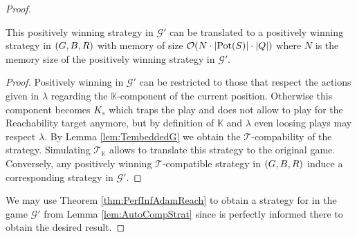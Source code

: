 \begin{proof}
\begin{lemma}
    This positively winning strategy in 
    $\mathcal{G'}$ can be translated to a positively winning strategy in 
    $\left(G, B, R\right)$ with memory of size 
    $\mathcal{O}(N\cdot\left\vert{\operatorname{Pot}(S)}\right\vert\cdot\left\vert{Q}\right\vert)$ where $N$ is the memory
    size of the positively winning strategy in $\mathcal{G'}$.
    \label{lem:AutoCompStrat}
  \end{lemma}
  \begin{proof}
    Positively winning in $\mathcal{G'}$ can be restricted to those that 
    respect the actions given in $\lambda$ regarding the $\mathbb{K}$-component 
    of the current position. Otherwise this component becomes $K_{s}$ which 
    traps the play and does not allow to play for the Reachability target 
    anymore, but by definition of $\mathbb{K}$ and $\lambda$ even loosing plays
    may respect $\lambda$. By Lemma \ref{lem:TembeddedG} we obtain the 
    $\mathcal{T}$-compability of the strategy. Simulating 
    $\mathcal{T}_{\mathbb{K}}$ allows to translate this strategy to the 
    original game. Conversely, any positively winning $\mathcal{T}$-compatible 
    strategy in $\left(G, B, R\right)$ induce a corresponding strategy in 
    $\mathcal{G'}$.
  \end{proof}
  We may use Theorem \ref{thm:PerfInfAdamReach} to obtain a strategy for \eve{}
  in the game $\mathcal{G'}$ from Lemma \ref{lem:AutoCompStrat} since \adam{}
  is perfectly informed there to obtain the desired result.
\end{proof}

